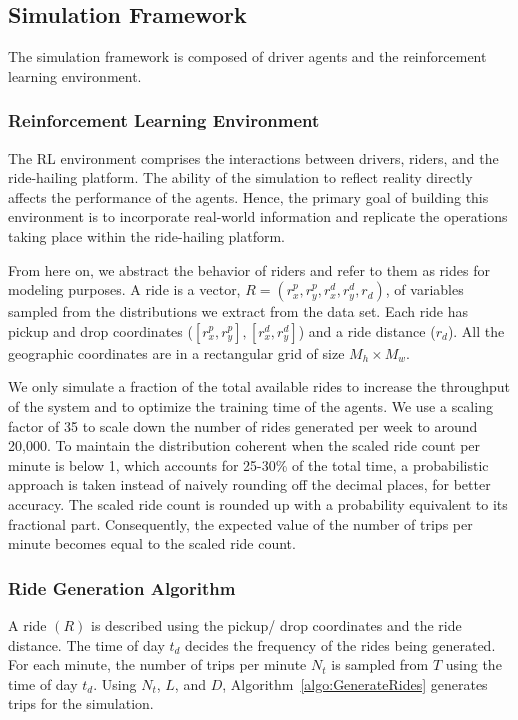 \documentclass[runningheads]{llncs}
\begin{document}
\subsection{Simulation Framework}

The simulation framework is composed of driver agents and the reinforcement learning environment.

\subsubsection{Reinforcement Learning Environment}

The RL environment comprises the interactions between drivers, riders, and the ride-hailing platform. The ability of the simulation to reflect reality directly affects the performance of the agents. Hence, the primary goal of building this environment is to incorporate real-world information and replicate the operations taking place within the ride-hailing platform.

From here on, we abstract the behavior of riders and refer to them as rides for modeling purposes. A ride is a vector, \(R = (r_x^p, r_y^p ,r_x^d, r_y^d, r_d)\), of variables sampled from the distributions we extract from the data set. Each ride has pickup and drop coordinates (\([r_x^p,r_y^p ], [r_x^d, r_y^d]\)) and a ride distance (\(r_d\)). All the geographic coordinates are in a rectangular grid of size \(M_h \times M_w\).

We only simulate a fraction of the total available rides to increase the throughput of the system and to optimize the training time of the agents. We use a scaling factor of 35 to scale down the number of rides generated per week to around 20,000. To maintain the distribution coherent when the scaled ride count per minute is below 1, which accounts for 25-30\% of the total time, a probabilistic approach is taken instead of naively rounding off the decimal places, for better accuracy. The scaled ride count is rounded up with a probability equivalent to its fractional part. Consequently, the expected value of the number of trips per minute becomes equal to the scaled ride count. 

\subsubsection{Ride Generation Algorithm}

A ride \((R)\) is described using the pickup/ drop coordinates and the ride distance. The time of day \(t_d\) decides the frequency of the rides being generated. For each minute, the number of trips per minute \(N_t\) is sampled from \(T\) using the time of day \(t_d\). Using \(N_t\), \(L\), and \(D\), Algorithm~\ref{algo:GenerateRides} generates trips for the simulation.
\end{document}
